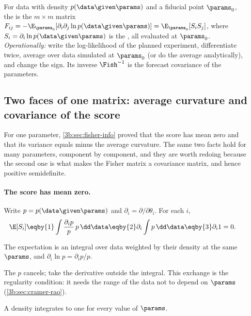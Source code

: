 \begin{workdef}
For data with density $p(\data\given\params)$ and a fiducial point $\params_0$, the  is the
$m\times m$ matrix
$F_{ij}=-\E_{\params_0}[\partial_i\partial_j\ln p(\data\given\params)]=\E_{\params_0}[S_iS_j]$,
where $S_i=\partial_i\ln p(\data\given\params)$ is the  , all evaluated at $\params_0$.
\emph{Operationally:} write the log-likelihood of the planned experiment, differentiate twice, average over
data simulated at $\params_0$ (or do the average analytically), and change the sign. Its inverse
$\Fish^{-1}$ is the forecast covariance of the parameters.
\end{workdef}

\subsection{Two faces of one matrix: average curvature and covariance of the score}
\label{10a:sec:two-faces}

For one parameter, \cref{3b:sec:fisher-info} proved that the score has mean zero and that its variance equals
minus the average curvature. The same two facts hold for many parameters, component by component, and
they are worth redoing because the second one is what makes the Fisher matrix a covariance matrix, and
hence positive semidefinite.

\paragraph{The score has mean zero.} Write $p=p(\data\given\params)$ and $\partial_i=\partial/\partial\theta_i$. For each $i$,
\begin{align}
  \E[S_i]
  &\eqby{1}\int\frac{\partial_ip}{p}\,p\,\dd\data
  \eqby{2}\partial_i\int p\,\dd\data
  \eqby{3}\partial_i1=0 .
  \label{10a:eq:score-mean}
\end{align}
\begin{explain}
  \item The expectation is an integral over data weighted by their density at the same $\params$, and
        $\partial_i\ln p=\partial_ip/p$.
  \item The $p$ cancels; take the derivative outside the integral. This exchange is the regularity
        condition: it needs the range of the data not to depend on $\params$ (\cref{3b:sec:cramer-rao}).
  \item A density integrates to one for every value of $\params$.
\end{explain}

